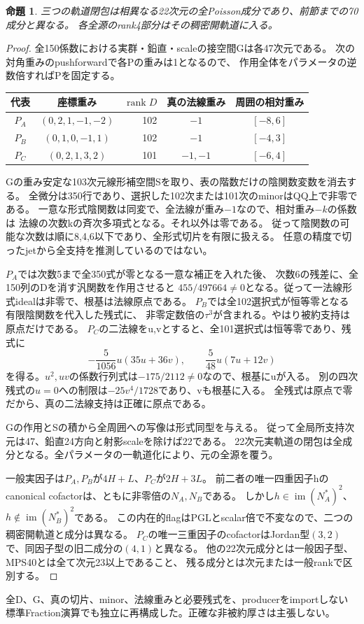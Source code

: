 \documentclass[a4paper,11pt]{ltjsarticle}
\newtheorem{proposition}{命題}[section]
\theoremstyle{definition}
\newcommand{\rank}{\operatorname{rank}}
\begin{document}
\begin{proposition}\label{prop:weighted-three22}
三つの軌道閉包は相異なる22次元の全Poisson成分であり、前節までの70成分と異なる。
各全源のrank4部分はその稠密開軌道に入る。
\end{proposition}
\begin{proof}
全150係数における実群・鉛直・scaleの接空間Gは各47次元である。
次の対角重みのpushforwardで各Pの重みは1となるので、
作用全体をパラメータの逆数倍すればPを固定する。
\begin{center}\small
\begin{tabular}{c|c|r|c|c}
代表&座標重み&$\rank D$&真の法線重み&周囲の相対重み\\\hline
$P_A$&$(0,2,1,-1,-2)$&102&$-1$&$[-8,6]$\\
$P_B$&$(0,1,0,-1,1)$&102&$-1$&$[-4,3]$\\
$P_C$&$(0,2,1,3,2)$&101&$-1,-1$&$[-6,4]$
\end{tabular}
\end{center}
Gの重み安定な103次元線形補空間Sを取り、表の階数だけの陰関数変数を消去する。
全微分は350行であり、選択した102次または101次のminorはQQ上で非零である。
一意な形式陰関数は同変で、全法線が重み$-1$なので、相対重み$-k$の係数は
法線の次数kの斉次多項式となる。それ以外は零である。
従って陰関数の可能な次数は順に8,4,6以下であり、全形式切片を有限に扱える。
任意の精度で切ったjetから全支持を推測しているのではない。

$P_A$では次数5まで全350式が零となる一意な補正を入れた後、
次数6の残差に、全150列のDを消す汎関数を作用させると
$455/497664\ne0$となる。従って一法線形式idealは非零で、根基は法線原点である。
$P_B$では全102選択式が恒等零となる有限陰関数を代入した残式に、
非零定数倍の$\tau^3$が含まれる。やはり被約支持は原点だけである。
$P_C$の二法線をu,vとすると、全101選択式は恒等零であり、残式に
\[
 -\frac5{1056}u(35u+36v),\qquad
 \frac5{48}u(7u+12v)
\]
を得る。$u^2,uv$の係数行列式は$-175/2112\ne0$なので、根基にuが入る。
別の四次残式の$u=0$への制限は$-25v^4/1728$であり、vも根基に入る。
全残式は原点で零だから、真の二法線支持は正確に原点である。

Gの作用とSの積から全周囲への写像は形式同型を与える。
従って全局所支持次元は47、鉛直24方向と射影scaleを除けば22である。
22次元実軌道の閉包は全成分となる。全パラメータの一軌道化により、元の全源を覆う。

一般実因子は$P_A,P_B$が$4H+L$、$P_C$が$2H+3L$。
前二者の唯一四重因子hのcanonical cofactorは、ともに非零倍の$N_A,N_B$である。
しかし$h\in\operatorname{im}(N_A^*)^2$、$h\notin\operatorname{im}(N_B^*)^2$である。
この内在的flagはPGLとscalar倍で不変なので、二つの稠密開軌道と成分は異なる。
$P_C$の唯一三重因子のcofactorはJordan型$(3,2)$で、同因子型の旧二成分の$(4,1)$と異なる。
他の22次元成分とは一般因子型、MPS40とは全て次元23以上であること、
残る成分とは次元または一般rankで区別する。
\end{proof}
全D、G、真の切片、minor、法線重みと必要残式を、producerをimportしない
標準Fraction演算でも独立に再構成した。正確な非被約厚さは主張しない。
\end{document}
